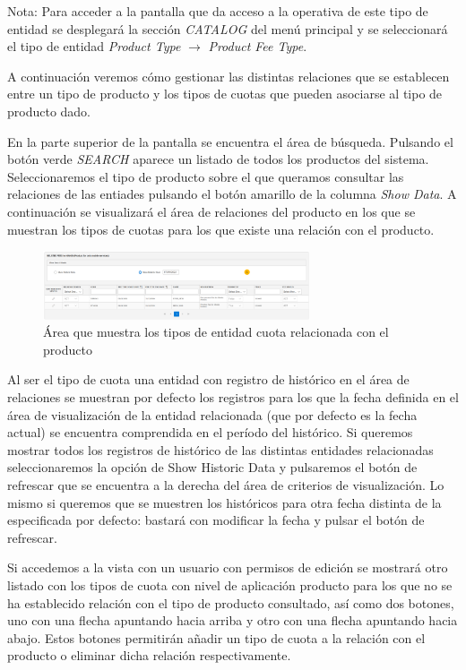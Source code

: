 Nota: Para acceder a la pantalla que da acceso a la operativa de este tipo de entidad se desplegará la sección \emph{CATALOG} del menú principal y se seleccionará el tipo de entidad \emph{Product Type} $\rightarrow$  \emph{Product Fee Type}.


A continuación veremos cómo gestionar las distintas relaciones que se establecen entre un tipo de producto y los tipos de cuotas que pueden asociarse al tipo de producto dado.


En la parte superior de la pantalla se encuentra el área de búsqueda. Pulsando el botón verde \emph{SEARCH} aparece un listado de todos los productos del sistema. Seleccionaremos el tipo de producto sobre el que queramos consultar las relaciones de las entiades pulsando el botón amarillo de la columna \emph{Show Data}. A continuación se visualizará el área de relaciones del producto en los que se muestran los tipos de cuotas para los que existe una relación con el producto.


\begin{figure}[H]
  \centering
  \includegraphics[width=0.70\textwidth]{imaxes/area-relacion-tipos-entidades.png}
  \caption{Área que muestra los tipos de entidad cuota relacionada con el producto}
  \label{fig:area-relacion-tipos-entidades}
\end{figure}



Al ser el tipo de cuota una entidad con registro de histórico en el área de relaciones se muestran por defecto los registros para los que la fecha definida en el área de visualización de la entidad relacionada (que por defecto es la fecha actual) se encuentra comprendida en el período del histórico. Si queremos mostrar todos los registros de histórico de las distintas entidades relacionadas seleccionaremos la opción de Show Historic Data y pulsaremos el botón de refrescar que se encuentra a la derecha del área de criterios de visualización. Lo mismo si queremos que se muestren los históricos para otra fecha distinta de la especificada por defecto: bastará con modificar la fecha y pulsar el botón de refrescar.

Si accedemos a la vista con un usuario con permisos de edición se mostrará otro listado con los tipos de cuota con nivel de aplicación producto para los que no se ha establecido relación con el tipo de producto consultado, así como dos botones, uno con una flecha apuntando hacia arriba y otro con una flecha apuntando hacia abajo. Estos botones permitirán añadir un tipo de cuota a la relación con el producto o eliminar dicha relación respectivamente. 



